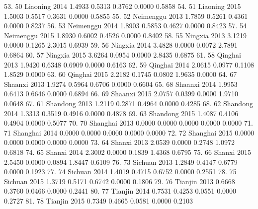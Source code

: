  53. {\VBAR}  50       Liaoning   2014   1.4933   0.5313   0.3762   0.0000   0.5858 {\VBAR}
 54. {\VBAR}  51       Liaoning   2015   1.5003   0.5517   0.3631   0.0000   0.5855 {\VBAR}
 55. {\VBAR}  52      Neimenggu   2013   1.7859   0.5261   0.4361   0.0000   0.8237 {\VBAR}
 56. {\VBAR}  53      Neimenggu   2014   1.8903   0.5853   0.4627   0.0000   0.8423 {\VBAR}
 57. {\VBAR}  54      Neimenggu   2015   1.8930   0.6002   0.4526   0.0000   0.8402 {\VBAR}
 58. {\VBAR}  55        Ningxia   2013   3.1219   0.0000   0.1265   2.3015   0.6939 {\VBAR}
 59. {\VBAR}  56        Ningxia   2014   3.4828   0.0000   0.0072   2.7891   0.6864 {\VBAR}
 60. {\VBAR}  57        Ningxia   2015   3.6264   0.0954   0.0000   2.8435   0.6875 {\VBAR}
 61. {\VBAR}  58        Qinghai   2013   1.9420   0.6348   0.6909   0.0000   0.6163 {\VBAR}
 62. {\VBAR}  59        Qinghai   2014   2.0615   0.0977   0.1108   1.8529   0.0000 {\VBAR}
 63. {\VBAR}  60        Qinghai   2015   2.2182   0.1745   0.0802   1.9635   0.0000 {\VBAR}
 64. {\VBAR}  67        Shaanxi   2013   1.9274   0.5964   0.6706   0.0000   0.6604 {\VBAR}
 65. {\VBAR}  68        Shaanxi   2014   1.9953   0.6413   0.6646   0.0000   0.6894 {\VBAR}
 66. {\VBAR}  69        Shaanxi   2015   2.0757   0.0399   0.0000   1.9710   0.0648 {\VBAR}
 67. {\VBAR}  61       Shandong   2013   1.2119   0.2871   0.4964   0.0000   0.4285 {\VBAR}
 68. {\VBAR}  62       Shandong   2014   1.3313   0.3519   0.4916   0.0000   0.4878 {\VBAR}
 69. {\VBAR}  63       Shandong   2015   1.4087   0.4106   0.4904   0.0000   0.5077 {\VBAR}
 70. {\VBAR}  70       Shanghai   2013   0.0000   0.0000   0.0000   0.0000   0.0000 {\VBAR}
 71. {\VBAR}  71       Shanghai   2014   0.0000   0.0000   0.0000   0.0000   0.0000 {\VBAR}
 72. {\VBAR}  72       Shanghai   2015   0.0000   0.0000   0.0000   0.0000   0.0000 {\VBAR}
 73. {\VBAR}  64         Shanxi   2013   2.0539   0.0000   0.2748   1.0972   0.6818 {\VBAR}
 74. {\VBAR}  65         Shanxi   2014   2.3002   0.0000   0.1839   1.4368   0.6795 {\VBAR}
 75. {\VBAR}  66         Shanxi   2015   2.5450   0.0000   0.0894   1.8447   0.6109 {\VBAR}
 76. {\VBAR}  73        Sichuan   2013   1.2849   0.4147   0.6779   0.0000   0.1923 {\VBAR}
 77. {\VBAR}  74        Sichuan   2014   1.4019   0.4715   0.6752   0.0000   0.2551 {\VBAR}
 78. {\VBAR}  75        Sichuan   2015   1.3719   0.5171   0.6742   0.0000   0.1806 {\VBAR}
 79. {\VBAR}  76        Tianjin   2013   0.6668   0.3760   0.0466   0.0000   0.2441 {\VBAR}
 80. {\VBAR}  77        Tianjin   2014   0.7531   0.4253   0.0551   0.0000   0.2727 {\VBAR}
 81. {\VBAR}  78        Tianjin   2015   0.7349   0.4665   0.0581   0.0000   0.2103 {\VBAR}
